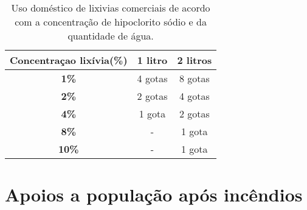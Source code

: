 \documentclass{report}
\begin{document}
\begin{table}
\begin{tabular}{|c||c||c|}
\hline
\textbf{Concentraçao lixívia(\%)}     &  \textbf{1 litro}  &  \textbf{2 litros}  \\ \hline
	\textbf{1\%}		      &  4 gotas	   &  8 gotas   \\ \hline
	\textbf{2\%}		      &	 2 gotas	   &  4 gotas   \\ \hline
	\textbf{4\%}		      &  1 gota	     	   &  2 gotas   \\ \hline
	\textbf{8\%}		      &     -    	   &  1 gota    \\ \hline
	\textbf{10\%}		      &     -    	   &  1 gota    \\ \hline
\end{tabular}
\caption{Uso doméstico de lixivias comerciais de acordo com a concentração de hipoclorito sódio e da quantidade de água.}
\end{table}



\chapter{Apoios a população após incêndios}
\cite{pgov2017}
\end{document}
